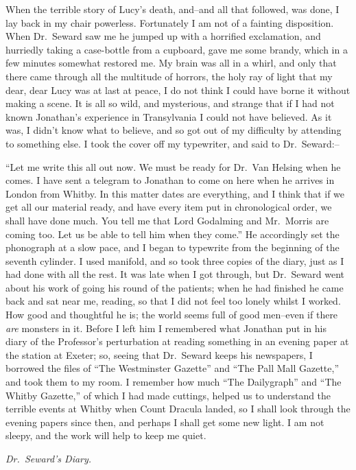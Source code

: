 \documentclass[12pt,openright]{book}
\begin{document}
When the terrible story of Lucy’s death, and–and all that followed, was done, I lay back in my chair powerless. Fortunately I am not of a fainting disposition. When Dr. Seward saw me he jumped up with a horrified exclamation, and hurriedly taking a case-bottle from a cupboard, gave me some brandy, which in a few minutes somewhat restored me. My brain was all in a whirl, and only that there came through all the multitude of horrors, the holy ray of light that my dear, dear Lucy was at last at peace, I do not think I could have borne it without making a scene. It is all so wild, and mysterious, and strange that if I had not known Jonathan’s experience in Transylvania I could not have believed. As it was, I didn’t know what to believe, and so got out of my difficulty by attending to something else. I took the cover off my typewriter, and said to Dr. Seward:–

“Let me write this all out now. We must be ready for Dr. Van Helsing when he comes. I have sent a telegram to Jonathan to come on here when he arrives in London from Whitby. In this matter dates are everything, and I think that if we get all our material ready, and have every item put in chronological order, we shall have done much. You tell me that Lord Godalming and Mr. Morris are coming too. Let us be able to tell him when they come.” He accordingly set the phonograph at a slow pace, and I began to typewrite from the beginning of the seventh cylinder. I used manifold, and so took three copies of the diary, just as I had done with all the rest. It was late when I got through, but Dr. Seward went about his work of going his round of the patients; when he had finished he came back and sat near me, reading, so that I did not feel too lonely whilst I worked. How good and thoughtful he is; the world seems full of good men–even if there \textit{are} monsters in it. Before I left him I remembered what Jonathan put in his diary of the Professor’s perturbation at reading something in an evening paper at the station at Exeter; so, seeing that Dr. Seward keeps his newspapers, I borrowed the files of “The Westminster Gazette” and “The Pall Mall Gazette,” and took them to my room. I remember how much “The Dailygraph” and “The Whitby Gazette,” of which I had made cuttings, helped us to understand the terrible events at Whitby when Count Dracula landed, so I shall look through the evening papers since then, and perhaps I shall get some new light. I am not sleepy, and the work will help to keep me quiet.

\textit{Dr. Seward’s Diary.}
\end{document}

